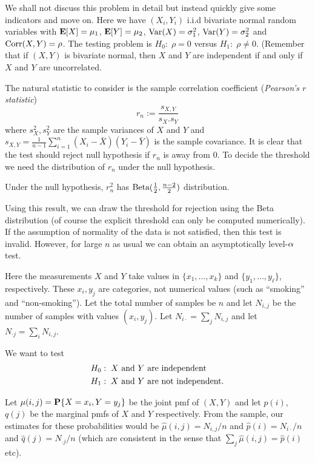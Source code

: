 \documentclass[preprint,  11pt]{amsart}
\def\half{\frac{1}{2}}
\def\sig{{\sigma}}
\begin{document}
 We shall not discuss this problem in detail but instead quickly give some indicators and move on. Here we have $(X_{i},Y_{i})$ i.i.d bivariate normal random variables with $\E[X]=\mu_{1}$, $\E[Y]=\mu_{2}$, $\Var(X)=\sig_{1}^{2}$, $\Var(Y)=\sig_{2}^{2}$ and $\mb{Corr}(X,Y)=\rho$. The testing problem is $H_{0}: \; \rho=0$ versus $H_{1}: \; \rho\not=0$. (Remember that if $(X,Y)$ is bivariate normal, then $X$ and $Y$ are independent if and only if $X$ and $Y$ are uncorrelated.

The natural statistic to consider is the sample correlation coefficient ({\em Pearson's $r$ statistic})
$$
r_{n}:=\frac{s_{X,Y}}{s_{X}.s_{Y}}
$$
where $s_{X}^{2},s_{Y}^{2}$ are the sample variances of $X$ and $Y$ and $s_{X,Y}=\frac{1}{n-1}\sum_{i=1}^{n}(X_{i}-\bar{X})(Y_{i}-\bar{Y})$ is the sample covariance. It is clear that the test should reject null hypothesis if $r_{n}$ is away from $0$. To decide the threshold we need the distribution of $r_{n}$ under the null hypothesis.

 Under the null hypothesis, $r_{n}^{2}$ has $\mb{Beta}(\half, \frac{n-2}{2})$ distribution.

\medskip

Using this result, we can draw the threshold for rejection using the Beta distribution (of course the explicit threshold can only be computed numerically). If the assumption of normality of the data is not satisfied, then this test is invalid. However, for large $n$ as usual we can obtain an asymptotically level-$\alp$ test.

Here the measurements $X$ and $Y$ take values in $\{x_{1},\ldots ,x_{k}\}$ and $\{y_{1},\ldots ,y_{\ell}\}$, respectively. These $x_{i},y_{j}$ are categories, not numerical values (such as ``smoking'' and ``non-smoking''). Let the total number of samples be $n$ and let $N_{i,j}$ be the number of samples with values $(x_{i},y_{j})$. Let $N_{i\cdot}=\sum_{j}N_{i,j}$ and let $N_{\cdot j}=\sum_{i}N_{i,j}$.

We want to test
\begin{align*}
H_{0}&: \; X \mb{ and } Y \mb{ are independent} \\
H_{1}&: \; X \mb{ and } Y \mb{ are not independent}.
\end{align*}

Let $\mu(i,j)=\P\{X=x_{i},Y=y_{j}\}$ be the joint pmf of $(X,Y)$ and let $p(i)$, $q(j)$ be the marginal pmfs of $X$ and $Y$ respectively. From the sample, our estimates for these probabilities would be $\hat{\mu}(i,j)=N_{i,j}/n$ and $\hat{p}(i)=N_{i\cdot}/n$ and $\hat{q}(j)=N_{\cdot j}/n$ (which are consistent in the sense that $\sum_{j}\hat{\mu}(i,j)=\hat{p}(i)$ etc).
\end{document}
